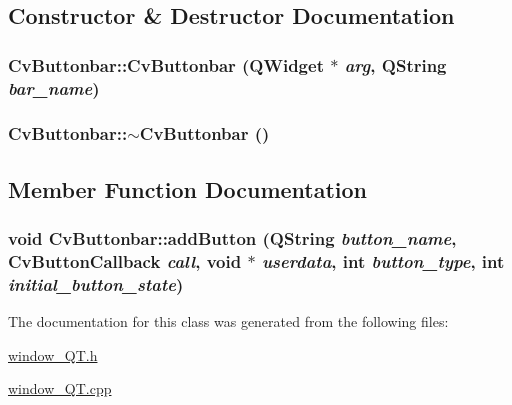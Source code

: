 \subsection{Constructor \& Destructor Documentation}
\hypertarget{classCvButtonbar_a2e242a93211a0ce57be59c9558c61487}{
\subsubsection[{CvButtonbar}]{\setlength{\rightskip}{0pt plus 5cm}CvButtonbar::CvButtonbar (QWidget $\ast$ {\em arg}, \/  QString {\em bar\_\-name})}}
\label{classCvButtonbar_a2e242a93211a0ce57be59c9558c61487}
\hypertarget{classCvButtonbar_a53d7f1aa214a6f8b31b9e69c8806f49f}{
\subsubsection[{$\sim$CvButtonbar}]{\setlength{\rightskip}{0pt plus 5cm}CvButtonbar::$\sim$CvButtonbar ()}}
\label{classCvButtonbar_a53d7f1aa214a6f8b31b9e69c8806f49f}


\subsection{Member Function Documentation}
\hypertarget{classCvButtonbar_a9d85c6030793e2abeab43e300ed81687}{
\subsubsection[{addButton}]{\setlength{\rightskip}{0pt plus 5cm}void CvButtonbar::addButton (QString {\em button\_\-name}, \/  CvButtonCallback {\em call}, \/  void $\ast$ {\em userdata}, \/  int {\em button\_\-type}, \/  int {\em initial\_\-button\_\-state})}}
\label{classCvButtonbar_a9d85c6030793e2abeab43e300ed81687}


The documentation for this class was generated from the following files:\begin{DoxyCompactItemize}
\item 
\hyperlink{window__QT_8h}{window\_\-QT.h}\item 
\hyperlink{window__QT_8cpp}{window\_\-QT.cpp}\end{DoxyCompactItemize}
